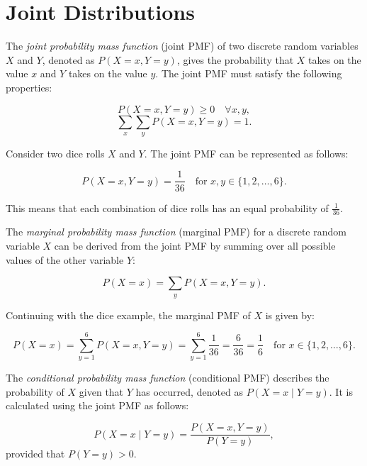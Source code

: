 \section{Joint Distributions}

\begin{definition}
    The \textit{joint probability mass function} (joint PMF) of two discrete random variables \( X \) and \( Y \), denoted as \( P(X = x, Y = y) \), gives the probability that \( X \) takes on the value \( x \) and \( Y \) takes on the value \( y \). The joint PMF must satisfy the following properties:

\[
P(X = x, Y = y) \geq 0 \quad \forall x, y,
\]
\[
\sum_{x} \sum_{y} P(X = x, Y = y) = 1.
\]
\end{definition}

\begin{example}
    Consider two dice rolls \( X \) and \( Y \). The joint PMF can be represented as follows:

\[
P(X = x, Y = y) = \frac{1}{36} \quad \text{for } x, y \in \{1, 2, \ldots, 6\}.
\]

This means that each combination of dice rolls has an equal probability of \( \frac{1}{36} \).
\end{example}

\begin{definition}
    The \textit{marginal probability mass function} (marginal PMF) for a discrete random variable \( X \) can be derived from the joint PMF by summing over all possible values of the other variable \( Y \):

\[
P(X = x) = \sum_{y} P(X = x, Y = y).
\]
\end{definition}

\begin{example}
    Continuing with the dice example, the marginal PMF of \( X \) is given by:

\[
P(X = x) = \sum_{y=1}^{6} P(X = x, Y = y) = \sum_{y=1}^{6} \frac{1}{36} = \frac{6}{36} = \frac{1}{6} \quad \text{for } x \in \{1, 2, \ldots, 6\}.
\]
\end{example}

\begin{definition}
    The \textit{conditional probability mass function} (conditional PMF) describes the probability of \( X \) given that \( Y \) has occurred, denoted as \( P(X = x \mid Y = y) \). It is calculated using the joint PMF as follows:

\[
P(X = x \mid Y = y) = \frac{P(X = x, Y = y)}{P(Y = y)},
\]
provided that \( P(Y = y) > 0 \).

\end{definition}

